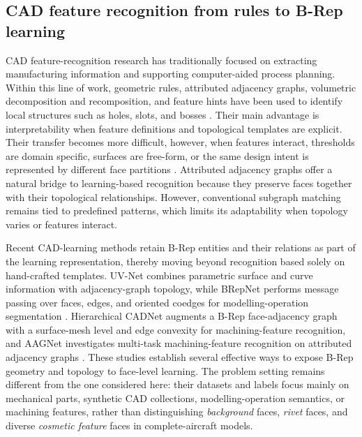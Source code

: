 \documentclass[12pt,a4paper]{article}
\begin{document}
\subsection{CAD feature recognition from rules to B-Rep learning}

CAD feature-recognition research has traditionally focused on extracting manufacturing information and supporting computer-aided process planning. Within this line of work, geometric rules, attributed adjacency graphs, volumetric decomposition and recomposition, and feature hints have been used to identify local structures such as holes, slots, and bosses \parencite{han2000manufacturing,shah2001discourse,babic2008review}. Their main advantage is interpretability when feature definitions and topological templates are explicit. Their transfer becomes more difficult, however, when features interact, thresholds are domain specific, surfaces are free-form, or the same design intent is represented by different face partitions \parencite{shah2001discourse}. Attributed adjacency graphs offer a natural bridge to learning-based recognition because they preserve faces together with their topological relationships. However, conventional subgraph matching remains tied to predefined patterns, which limits its adaptability when topology varies or features interact.

Recent CAD-learning methods retain B-Rep entities and their relations as part of the learning representation, thereby moving beyond recognition based solely on hand-crafted templates. UV-Net combines parametric surface and curve information with adjacency-graph topology, while BRepNet performs message passing over faces, edges, and oriented coedges for modelling-operation segmentation \parencite{jayaraman2021uvnet,lambourne2021brepnet}. Hierarchical CADNet augments a B-Rep face-adjacency graph with a surface-mesh level and edge convexity for machining-feature recognition, and AAGNet investigates multi-task machining-feature recognition on attributed adjacency graphs \parencite{colligan2022hierarchical,wu2024aagnet}. These studies establish several effective ways to expose B-Rep geometry and topology to face-level learning. The problem setting remains different from the one considered here: their datasets and labels focus mainly on mechanical parts, synthetic CAD collections, modelling-operation semantics, or machining features, rather than distinguishing \textit{background} faces, \textit{rivet} faces, and diverse \textit{cosmetic feature} faces in complete-aircraft models.
\end{document}
